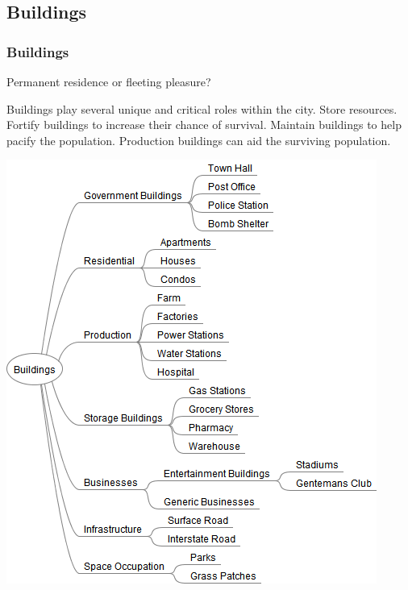 \documentclass[ascpectratio=169]{beamer}
\begin{document}
\subsection{Buildings}


\begin{frame}

  \frametitle{Buildings}

  \begin{center}
    {\large Permanent residence or fleeting pleasure?}
  \end{center}

  \begin{multicols}{2}

  \begin{outline}
    \1 Buildings play several unique and critical roles within the city.
    \1 Store resources.
    \1 Fortify buildings to increase their chance of survival.
    \1 Maintain buildings to help pacify the population.
    \1 Production buildings can aid the surviving population.
  \end{outline}

  \columnbreak

  \begin{center}
    \includegraphics[scale=0.34, trim=4cm 0 4.5cm 0]{../../Diagrams/Buildings/Buildings.png}
  \end{center}

  \end{multicols}

\end{frame}
\end{document}
